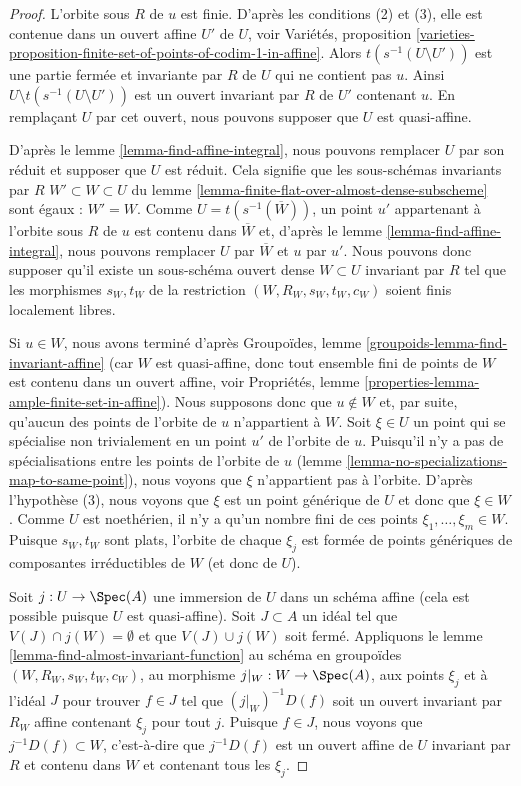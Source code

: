 \begin{proof}
L'orbite sous $R$ de $u$ est finie. D'après les conditions (2) et (3), elle est contenue
dans un ouvert affine $U'$ de $U$, voir
Variétés, proposition
\ref{varieties-proposition-finite-set-of-points-of-codim-1-in-affine}.
Alors $t(s^{-1}(U \setminus U'))$ est une partie fermée et invariante par $R$
de $U$ qui ne contient pas $u$. Ainsi
$U \setminus t(s^{-1}(U \setminus U'))$ est un ouvert invariant par $R$
de $U'$ contenant $u$.
En remplaçant $U$ par cet ouvert, nous pouvons supposer que $U$ est quasi-affine.

\medskip\noindent
D'après le lemme \ref{lemma-find-affine-integral}, nous pouvons remplacer $U$ par son réduit
et supposer que $U$ est réduit. Cela signifie que les sous-schémas invariants par $R$
$W' \subset W \subset U$ du
lemme \ref{lemma-finite-flat-over-almost-dense-subscheme}
sont égaux : $W' = W$. Comme $U = t(s^{-1}(\overline{W}))$, un point
$u'$ appartenant à l'orbite sous $R$ de $u$ est contenu dans $\overline{W}$
et, d'après le lemme \ref{lemma-find-affine-integral},
nous pouvons remplacer $U$ par $\overline{W}$ et $u$ par $u'$.
Nous pouvons donc supposer qu'il existe
un sous-schéma ouvert dense $W \subset U$ invariant par $R$ tel que
les morphismes $s_W, t_W$ de la restriction $(W, R_W, s_W, t_W, c_W)$ soient
finis localement libres.

\medskip\noindent
Si $u \in W$, nous avons terminé d'après
Groupoïdes, lemme \ref{groupoids-lemma-find-invariant-affine}
(car $W$ est quasi-affine, donc tout ensemble fini de points
de $W$ est contenu dans un ouvert affine, voir
Propriétés, lemme \ref{properties-lemma-ample-finite-set-in-affine}).
Nous supposons donc que $u \not \in W$ et, par suite, qu'aucun des points de
l'orbite de $u$ n'appartient à $W$. Soit $\xi \in U$
un point qui se spécialise non trivialement en un point $u'$ de l'orbite
de $u$. Puisqu'il n'y a pas de spécialisations entre les points de
l'orbite de $u$ (lemme \ref{lemma-no-specializations-map-to-same-point}),
nous voyons que $\xi$ n'appartient pas à l'orbite.
D'après l'hypothèse (3), nous voyons que $\xi$ est un point générique de $U$
et donc que $\xi \in W$.
Comme $U$ est noethérien, il n'y a qu'un nombre fini de ces
points $\xi_1, \ldots, \xi_m \in W$. Puisque $s_W, t_W$ sont plats, l'orbite
de chaque $\xi_j$ est formée de points génériques de composantes irréductibles
de $W$ (et donc de $U$).

\medskip\noindent
Soit $j : U \to \Spec(A)$ une immersion de $U$ dans un schéma affine
(cela est possible puisque $U$ est quasi-affine). Soit $J \subset A$
un idéal tel que $V(J) \cap j(W) = \emptyset$ et que $V(J) \cup j(W)$
soit fermé. Appliquons le lemme \ref{lemma-find-almost-invariant-function}
au schéma en groupoïdes $(W, R_W, s_W, t_W, c_W)$, au morphisme
$j|_W : W \to \Spec(A)$, aux points $\xi_j$ et à l'idéal $J$
pour trouver $f \in J$ tel que $(j|_W)^{-1}D(f)$ soit un ouvert invariant par $R_W$
affine contenant $\xi_j$ pour tout $j$. Puisque $f \in J$,
nous voyons que $j^{-1}D(f) \subset W$, c'est-à-dire que $j^{-1}D(f)$ est
un ouvert affine de $U$ invariant par $R$ et contenu dans $W$
et contenant tous les $\xi_j$.


\end{proof}

